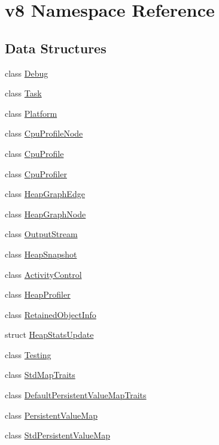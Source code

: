 \hypertarget{namespacev8}{\section{v8 Namespace Reference}
\label{namespacev8}
}
\subsection*{Data Structures}
\begin{DoxyCompactItemize}
\item 
class \hyperlink{classv8_1_1Debug}{Debug}
\item 
class \hyperlink{classv8_1_1Task}{Task}
\item 
class \hyperlink{classv8_1_1Platform}{Platform}
\item 
class \hyperlink{classv8_1_1CpuProfileNode}{Cpu\-Profile\-Node}
\item 
class \hyperlink{classv8_1_1CpuProfile}{Cpu\-Profile}
\item 
class \hyperlink{classv8_1_1CpuProfiler}{Cpu\-Profiler}
\item 
class \hyperlink{classv8_1_1HeapGraphEdge}{Heap\-Graph\-Edge}
\item 
class \hyperlink{classv8_1_1HeapGraphNode}{Heap\-Graph\-Node}
\item 
class \hyperlink{classv8_1_1OutputStream}{Output\-Stream}
\item 
class \hyperlink{classv8_1_1HeapSnapshot}{Heap\-Snapshot}
\item 
class \hyperlink{classv8_1_1ActivityControl}{Activity\-Control}
\item 
class \hyperlink{classv8_1_1HeapProfiler}{Heap\-Profiler}
\item 
class \hyperlink{classv8_1_1RetainedObjectInfo}{Retained\-Object\-Info}
\item 
struct \hyperlink{structv8_1_1HeapStatsUpdate}{Heap\-Stats\-Update}
\item 
class \hyperlink{classv8_1_1Testing}{Testing}
\item 
class \hyperlink{classv8_1_1StdMapTraits}{Std\-Map\-Traits}
\item 
class \hyperlink{classv8_1_1DefaultPersistentValueMapTraits}{Default\-Persistent\-Value\-Map\-Traits}
\item 
class \hyperlink{classv8_1_1PersistentValueMap}{Persistent\-Value\-Map}
\item 
class \hyperlink{classv8_1_1StdPersistentValueMap}{Std\-Persistent\-Value\-Map}
\item 

\end{DoxyCompactItemize}
